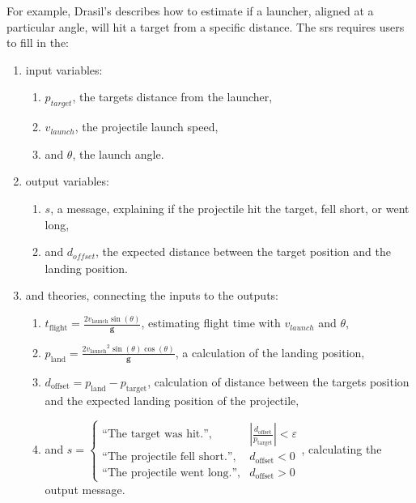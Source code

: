For example, Drasil's 
describes how to estimate if a launcher, aligned at a particular angle, will hit
a target from a specific distance. The \acs{srs} requires users to fill in the:
\begin{enumerate}
    \item input variables:
          \begin{enumerate}
              \item \(p_\mathit{target}\), the targets distance from the
                    launcher,
              \item \(v_\mathit{launch}\), the projectile launch speed,
              \item and \(\theta\), the launch angle.
          \end{enumerate}
    \item output variables:
          \begin{enumerate}
              \item \(s\), a message, explaining if the projectile hit the
                    target, fell short, or went long,
              \item and \(d_\mathit{offset}\), the expected distance between the
                    target position and the landing position.
          \end{enumerate}
    \item and theories, connecting the inputs to the outputs:
          \begin{enumerate}
              \item \({t_{\text{flight}}}=\frac{2 {v_{\text{launch}}}
                        \sin\left(\theta{}\right)}{\mathbf{g}}\), estimating
                    flight time with \(v_{\mathit{launch}}\) and \(\theta\),
              \item \({p_{\text{land}}}=\frac{2 {v_{\text{launch}}}^{2}
                        \sin\left(\theta{}\right)
                        \cos\left(\theta{}\right)}{\mathbf{g}}\), a calculation
                    of the landing position,
              \item \({d_{\text{offset}}}={p_{\text{land}}}-{p_{\text{target}}}\),
                    calculation of distance between the targets position and the
                    expected landing position of the projectile,
              \item and \(s=\begin{cases} \text{``The target was hit.''}, &
              |\frac{{d_{\text{offset}}}}{{p_{\text{target}}}}| < \varepsilon{}
              \\
              \text{``The projectile fell short.''}, & {d_{\text{offset}}} < 0 \\
              \text{``The projectile went long.''},  & {d_{\text{offset}}} >
              0\end{cases}\), \newline{}calculating the output message.
          \end{enumerate}
\end{enumerate}

